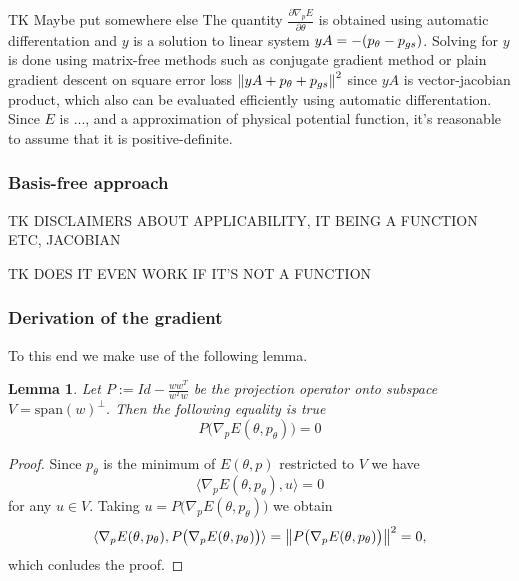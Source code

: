 \documentclass[a4paper,10pt]{report}
\newtheorem{statement}{Statement}
\newtheorem{lemma}{Lemma}
\begin{document}
TK Maybe put somewhere else
The quantity $\frac{\partial \nabla_p E}{\partial \theta}$ is obtained using automatic differentation and $y$ is a solution to linear system $yA = -(p_\theta-p_{gs})$. Solving for $y$ is done using matrix-free methods such as conjugate gradient method or plain gradient descent on square error loss $\left\|yA + p_\theta+p_{gs}\right\|^2$ since $yA$ is vector-jacobian product, which also can be evaluated efficiently using automatic differentation. Since $E$ is ..., and a approximation of physical potential function, it's reasonable to assume that it is positive-definite.

\subsubsection{Basis-free approach}


TK DISCLAIMERS ABOUT APPLICABILITY, IT BEING A FUNCTION ETC, JACOBIAN

TK DOES IT EVEN WORK IF IT'S NOT A FUNCTION
\subsubsection{Derivation of the gradient}
 To this end we make use of the following lemma.

\begin{lemma}
 Let $P := Id -\frac{ww^T}{w^Tw} $ be the projection operator onto subspace $V = \text{span}(w)^{\perp}$. Then the following equality is true
 \begin{equation}
  P\big(\nabla_p E(\theta, p_\theta)\big) = 0
 \end{equation}

\end{lemma}

\begin{proof}
  Since $p_\theta$ is the minimum of $E(\theta,p)$ restricted to $V$ we have \[\langle \nabla_p E(\theta,p_{\theta}), u \rangle = 0\] for any $u\in V$. Taking $u = P\big( \nabla_p E(\theta,p_\theta)\big)$ we obtain
  \[\langle \nabla_p E(\theta,p_{\theta}), P\big( \nabla_p E(\theta,p_\theta)\big) \rangle = \left\|P\big( \nabla_p E(\theta,p_\theta)\big)\right\|^2=0,\]
  which conludes the proof.
\end{proof}
\end{document}
